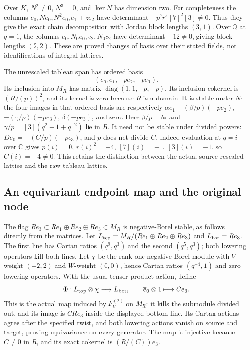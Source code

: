 Over $K$, $N^2\ne0$, $N^3=0$, and $\ker N$ has dimension two.
For completeness the columns
$e_0,Ne_0,N^2e_0,e_1+ze_2$ have determinant
$-p^2r^4[7]^2[3]\ne0$. Thus they give the exact chain decomposition
with Jordan block lengths $(3,1)$. Over $\mathbb Q$ at $q=1$, the
columns $e_0,N_0e_0,e_2,N_0e_2$ have determinant $-12\ne0$,
giving block lengths $(2,2)$. These are proved changes of basis over
their stated fields, not identifications of integral lattices.

The unrescaled tableau span has ordered basis
\[
 (e_0,e_1,-pe_2,-pe_3).
\]
Its inclusion into $M_R$ has matrix
$\operatorname{diag}(1,1,-p,-p)$.
Its inclusion cokernel is $(R/(p))^2$, and its kernel is zero because
$R$ is a domain. It is stable under $N$: the four images in that
ordered basis are respectively
$\alpha e_1-(\beta/p)(-pe_2)$, $-(\gamma/p)(-pe_3)$,
$\delta(-pe_3)$, and zero. Here $\beta/p=b_*$ and
$\gamma/p=[3](q^2-1+q^{-2})$ lie in $R$.
It need not be stable under divided powers: $De_0=-(C/p)(-pe_3)$,
and $p$ does not divide $C$. Indeed evaluation at $q=i$ over
$\mathbb C$ gives $p(i)=0$, $r(i)^2=-4$, $[7](i)=-1$,
$[3](i)=-1$, so $C(i)=-4\ne0$. This retains the distinction between
the actual source-rescaled lattice and the raw tableau lattice.

\subsection{An equivariant endpoint map and the original node}

The flag $Re_3\subset Re_1\oplus Re_2\oplus Re_3\subset M_R$
is negative-Borel stable, as follows directly from the matrices.
Let $L_{\rm top}=M_R/(Re_1\oplus Re_2\oplus Re_3)$ and
$L_{\rm bot}=Re_3$. The first line has Cartan ratios $(q^9,q^3)$
and the second $(q^5,q^3)$; both lowering operators kill both lines.
Let $\chi$ be the rank-one negative-Borel module with $V$-weight
$(-2,2)$ and $W$-weight $(0,0)$, hence Cartan ratios
$(q^{-4},1)$ and zero lowering operators. With the usual tensor-product
action, define
\[
 \Phi:L_{\rm top}\otimes\chi\longrightarrow L_{\rm bot},\qquad
 \overline e_0\otimes1\longmapsto Ce_3.
\]
This is the actual map induced by $F_V^{(2)}$ on $M_R$: it kills
the submodule divided out, and its image is $CR e_3$ inside the displayed
bottom line. Its Cartan actions agree after the specified twist, and both
lowering actions vanish on source and target, proving equivariance
on every generator. The map is injective because $C\ne0$ in $R$,
and its exact cokernel is $(R/(C))e_3$.


